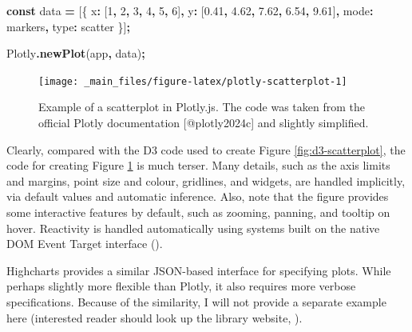 \documentclass[
]{book}
\newenvironment{Shaded}{\begin{snugshade}}{\end{snugshade}}
\newcommand{\DataTypeTok}[1]{\textcolor[rgb]{0.13,0.29,0.53}{#1}}
\newcommand{\DecValTok}[1]{\textcolor[rgb]{0.00,0.00,0.81}{#1}}
\newcommand{\FloatTok}[1]{\textcolor[rgb]{0.00,0.00,0.81}{#1}}
\newcommand{\FunctionTok}[1]{\textcolor[rgb]{0.13,0.29,0.53}{\textbf{#1}}}
\newcommand{\KeywordTok}[1]{\textcolor[rgb]{0.13,0.29,0.53}{\textbf{#1}}}
\newcommand{\NormalTok}[1]{#1}
\newcommand{\OperatorTok}[1]{\textcolor[rgb]{0.81,0.36,0.00}{\textbf{#1}}}
\newcommand{\StringTok}[1]{\textcolor[rgb]{0.31,0.60,0.02}{#1}}
\begin{document}
\begin{Shaded}
\begin{Highlighting}[]
\KeywordTok{const}\NormalTok{ data }\OperatorTok{=}\NormalTok{ [\{}
  \DataTypeTok{x}\OperatorTok{:}\NormalTok{ [}\DecValTok{1}\OperatorTok{,} \DecValTok{2}\OperatorTok{,} \DecValTok{3}\OperatorTok{,} \DecValTok{4}\OperatorTok{,} \DecValTok{5}\OperatorTok{,} \DecValTok{6}\NormalTok{]}\OperatorTok{,}
  \DataTypeTok{y}\OperatorTok{:}\NormalTok{ [}\FloatTok{0.41}\OperatorTok{,} \FloatTok{4.62}\OperatorTok{,} \FloatTok{7.62}\OperatorTok{,} \FloatTok{6.54}\OperatorTok{,} \FloatTok{9.61}\NormalTok{]}\OperatorTok{,}
  \DataTypeTok{mode}\OperatorTok{:} \StringTok{\textquotesingle{}markers\textquotesingle{}}\OperatorTok{,}
  \DataTypeTok{type}\OperatorTok{:} \StringTok{\textquotesingle{}scatter\textquotesingle{}}
\NormalTok{\}]}\OperatorTok{;}

\NormalTok{Plotly}\OperatorTok{.}\FunctionTok{newPlot}\NormalTok{(}\StringTok{\textquotesingle{}app\textquotesingle{}}\OperatorTok{,}\NormalTok{ data)}\OperatorTok{;}
\end{Highlighting}
\end{Shaded}

\label{app}

\begin{figure}

{\centering \texttt{[image: \_main\_files/figure-latex/plotly-scatterplot-1]} 

}

\caption{Example of a scatterplot in Plotly.js. The code was taken from the official Plotly documentation [@plotly2024c] and slightly simplified.}\label{fig:plotly-scatterplot}
\end{figure}

Clearly, compared with the D3 code used to create Figure \ref{fig:d3-scatterplot}, the code for creating Figure \ref{fig:plotly-scatterplot} is much terser. Many details, such as the axis limits and margins, point size and colour, gridlines, and widgets, are handled implicitly, via default values and automatic inference. Also, note that the figure provides some interactive features by default, such as zooming, panning, and tooltip on hover. Reactivity is handled automatically using systems built on the native DOM Event Target interface ().

Highcharts provides a similar JSON-based interface for specifying plots. While perhaps slightly more flexible than Plotly, it also requires more verbose specifications. Because of the similarity, I will not provide a separate example here (interested reader should look up the library website, ).
\end{document}
